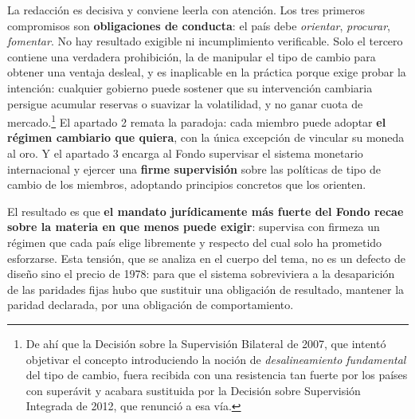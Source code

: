 \documentclass[10pt,a4paper]{article}
\begin{document}
La redacción es decisiva y conviene leerla con atención. Los tres primeros compromisos son \textbf{obligaciones de conducta}: el país debe \textit{orientar}, \textit{procurar}, \textit{fomentar}. No hay resultado exigible ni incumplimiento verificable. Solo el tercero contiene una verdadera prohibición, la de manipular el tipo de cambio para obtener una ventaja desleal, y es inaplicable en la práctica porque exige probar la intención: cualquier gobierno puede sostener que su intervención cambiaria persigue acumular reservas o suavizar la volatilidad, y no ganar cuota de mercado.\footnote{%
    De ahí que la Decisión sobre la Supervisión Bilateral de 2007, que intentó objetivar el concepto introduciendo la noción de \textit{desalineamiento fundamental} del tipo de cambio, fuera recibida con una resistencia tan fuerte por los países con superávit y acabara sustituida por la Decisión sobre Supervisión Integrada de 2012, que renunció a esa vía.
} El apartado 2 remata la paradoja: cada miembro puede adoptar \textbf{el régimen cambiario que quiera}, con la única excepción de vincular su moneda al oro. Y el apartado 3 encarga al Fondo supervisar el sistema monetario internacional y ejercer una \textbf{firme supervisión} sobre las políticas de tipo de cambio de los miembros, adoptando principios concretos que los orienten.

El resultado es que \textbf{el mandato jurídicamente más fuerte del Fondo recae sobre la materia en que menos puede exigir}: supervisa con firmeza un régimen que cada país elige libremente y respecto del cual solo ha prometido esforzarse. Esta tensión, que se analiza en el cuerpo del tema, no es un defecto de diseño sino el precio de 1978: para que el sistema sobreviviera a la desaparición de las paridades fijas hubo que sustituir una obligación de resultado, mantener la paridad declarada, por una obligación de comportamiento.
\end{document}
